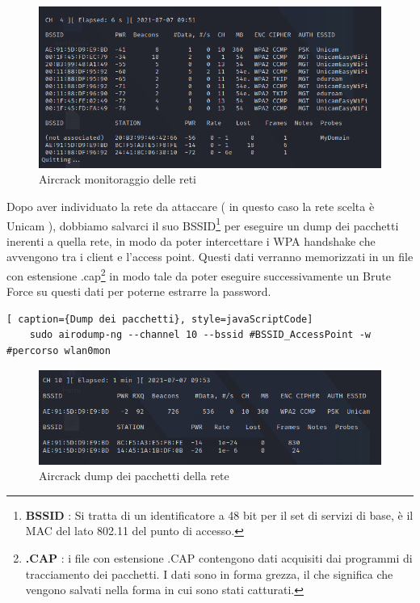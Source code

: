 \begin{figure}[ht]
    \centering
    \includegraphics[width=\linewidth]{Immagini/6/aircrack_3.png}
    \caption{Aircrack monitoraggio delle reti }
    \label{fig:Aircrack esempio}
\end{figure}

\newpage

Dopo aver individuato la rete da attaccare ( in questo caso la rete scelta è Unicam ), dobbiamo salvarci il suo BSSID\footnote[1]{\textbf{BSSID} : Si tratta di un identificatore a 48 bit per il set di servizi di base, è il MAC del lato 802.11 del punto di accesso.} per eseguire un dump dei pacchetti inerenti a quella rete, in modo da poter intercettare i WPA handshake che avvengono tra i client e l'access point. Questi dati verranno memorizzati in un file con estensione .cap\footnote[1]{\textbf{.CAP} : i file con estensione .CAP contengono dati acquisiti dai programmi di tracciamento dei pacchetti. I dati sono in forma grezza, il che significa che vengono salvati nella forma in cui sono stati catturati.} in modo tale da poter eseguire successivamente un Brute Force su questi dati per poterne estrarre la password.

\begin{lstlisting}[ caption={Dump dei pacchetti}, style=javaScriptCode]
	sudo airodump-ng --channel 10 --bssid #BSSID_AccessPoint -w #percorso wlan0mon
\end{lstlisting}

\begin{figure}[ht]
    \centering
    \includegraphics[width=\linewidth]{Immagini/6/aircrack_4.png}
    \caption{Aircrack dump dei pacchetti della rete}
    \label{fig:Aircrack esempio}
\end{figure}

